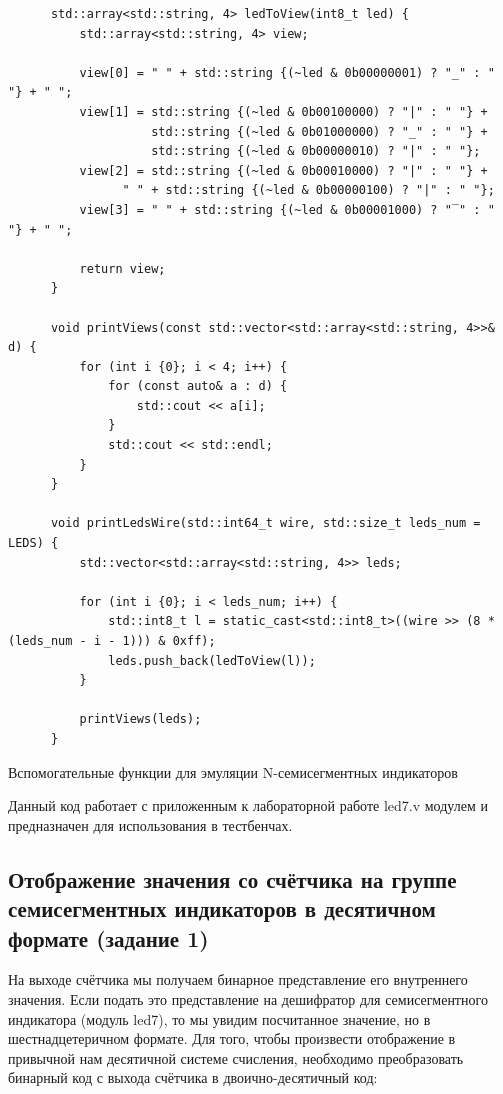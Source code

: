 \documentclass[a4paper]{article}
\begin{document}
  \begin{listing}[H]
    \begin{verbatim}
      std::array<std::string, 4> ledToView(int8_t led) {
          std::array<std::string, 4> view;

          view[0] = " " + std::string {(~led & 0b00000001) ? "_" : " "} + " ";
          view[1] = std::string {(~led & 0b00100000) ? "|" : " "} + 
                    std::string {(~led & 0b01000000) ? "_" : " "} +
                    std::string {(~led & 0b00000010) ? "|" : " "};
          view[2] = std::string {(~led & 0b00010000) ? "|" : " "} +
                " " + std::string {(~led & 0b00000100) ? "|" : " "};
          view[3] = " " + std::string {(~led & 0b00001000) ? "‾" : " "} + " "; 

          return view;
      }

      void printViews(const std::vector<std::array<std::string, 4>>& d) {
          for (int i {0}; i < 4; i++) {
              for (const auto& a : d) {
                  std::cout << a[i];
              }
              std::cout << std::endl;
          }
      }

      void printLedsWire(std::int64_t wire, std::size_t leds_num = LEDS) {
          std::vector<std::array<std::string, 4>> leds;

          for (int i {0}; i < leds_num; i++) {
              std::int8_t l = static_cast<std::int8_t>((wire >> (8 * (leds_num - i - 1))) & 0xff);
              leds.push_back(ledToView(l));
          }

          printViews(leds);   
      }
    \end{verbatim}
    \caption{Вспомогательные функции для эмуляции N-семисегментных индикаторов}
  \end{listing}

  Данный код работает с приложенным к лабораторной работе led7.v модулем
  и предназначен для использования в тестбенчах.

  \subsection{Отображение значения со счётчика на группе семисегментных индикаторов в десятичном формате (задание 1)}

  На выходе счётчика мы получаем бинарное представление его внутреннего
  значения. Если подать это представление на дешифратор для семисегментного
  индикатора (модуль led7), то мы увидим посчитанное значение, но в шестнадцетеричном формате.
  Для того, чтобы произвести отображение в привычной нам десятичной системе
  счисления, необходимо преобразовать бинарный код с выхода счётчика в
  двоично-десятичный код:
\end{document}
